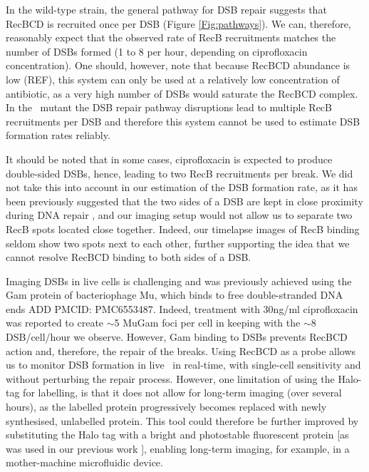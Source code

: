 In the wild-type strain, the general pathway for DSB repair suggests that RecBCD is recruited once per DSB (Figure \ref{Fig:pathways}). We can, therefore, reasonably expect that the observed rate of RecB recruitments matches the number of DSBs formed (1 to 8 per hour, depending on ciprofloxacin concentration). One should, however, note that because RecBCD abundance is low (REF), this system can only be used at a relatively low concentration of antibiotic, as a very high number of DSBs would saturate the RecBCD complex. In the \dreca\ mutant the DSB repair pathway disruptions lead to multiple RecB recruitments per DSB and therefore this system cannot be used to estimate DSB formation rates reliably. 

It should be noted that in some cases, ciprofloxacin is expected to produce double-sided DSBs, hence, leading to two RecB recruitments per break. We did not take this into account in our estimation of the DSB formation rate, as it has been previously suggested that the two sides of a DSB are kept in close proximity during DNA repair \cite{Vickridge2017,Keyamura2019}, and our imaging setup would not allow us to separate two RecB spots located close together. Indeed, our timelapse images of RecB binding seldom show two spots next to each other, further supporting the idea that we cannot resolve RecBCD binding to both sides of a DSB.

Imaging DSBs in live cells is challenging and was previously achieved using the Gam protein of bacteriophage Mu, which binds to free double-stranded DNA ends \cite{Shee2013,Henrikus2020}ADD PMCID: PMC6553487. Indeed, treatment with 30ng/ml ciprofloxacin was reported to create $\sim$5 MuGam foci per cell in keeping with the $\sim$8 DSB/cell/hour we observe. However, Gam binding to DSBs prevents RecBCD action and, therefore, the repair of the breaks. Using RecBCD as a probe allows us to monitor DSB formation in live \ecoli\ in real-time, with single-cell sensitivity and without perturbing the repair process. However, one limitation of using the Halo-tag for labelling, is that it does not allow for long-term imaging (over several hours), as the labelled protein progressively becomes replaced with newly synthesised, unlabelled protein. This tool could therefore be further improved by substituting the Halo tag with a bright and photostable fluorescent protein [as was used in our previous work \cite{Lepore2019a}], enabling long-term imaging, for example, in a mother-machine microfluidic device.


